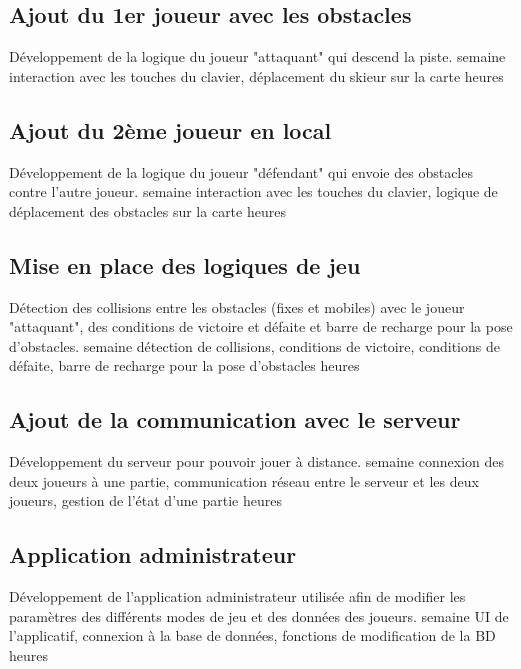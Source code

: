 \documentclass[a4paper,11pt]{article}
\begin{document}
		\subsection{Ajout du 1er joueur avec les obstacles}
		\begin{enumerate}[labelwidth=5em,leftmargin=8em]
			\objectif Développement de la logique du joueur "attaquant" qui descend la piste.
			 semaine
			\partageTache interaction avec les touches du clavier, déplacement du skieur sur la carte
			 heures
		\end{enumerate}
		\subsection{Ajout du 2ème joueur en local}
		\begin{enumerate}[labelwidth=5em,leftmargin=8em]
			\objectif Développement de la logique du joueur "défendant" qui envoie des obstacles contre l'autre joueur.
			 semaine
			\partageTache interaction avec les touches du clavier, logique de déplacement des obstacles sur la carte
			 heures
		\end{enumerate}
		\subsection{Mise en place des logiques de jeu}
		\begin{enumerate}[labelwidth=5em,leftmargin=8em]
			\objectif Détection des collisions entre les obstacles (fixes et mobiles) avec le joueur "attaquant", des conditions de victoire et défaite et barre de recharge pour la pose d'obstacles.
			 semaine
			\partageTache détection de collisions, conditions de victoire, conditions de défaite, barre de recharge pour la pose d'obstacles
			 heures
		\end{enumerate}
		\subsection{Ajout de la communication avec le serveur}
		\begin{enumerate}[labelwidth=5em,leftmargin=8em]
			\objectif Développement du serveur pour pouvoir jouer à distance.
			 semaine
			\partageTache connexion des deux joueurs à une partie, communication réseau entre le serveur et les deux joueurs, gestion de l'état d'une partie
			 heures
		\end{enumerate}
		\subsection{Application administrateur}
		\begin{enumerate}[labelwidth=5em,leftmargin=8em]
			\objectif Développement de l'application administrateur utilisée afin de modifier les paramètres des différents modes de jeu et des données des joueurs.
			 semaine
			\partageTache UI de l'applicatif, connexion à la base de données, fonctions de modification de la BD
			 heures
		\end{enumerate}
\end{document}
